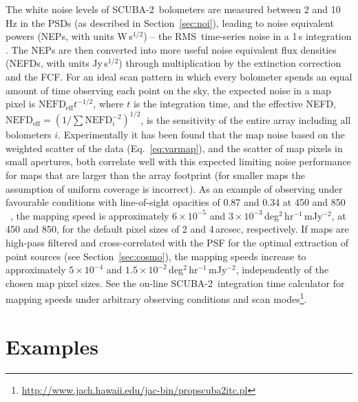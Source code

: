 \documentclass[useAMS,usenatbib,nofootinbib]{mn2e}
\newcommand{\scuba}{SCUBA-2}
\newcommand{\rms}{RMS}
\begin{document}
The white noise levels of \scuba\ bolometers are measured between 2
and 10\,Hz in the PSDs (as described in Section~\ref{sec:noi}),
leading to noise equivalent powers (NEPs, with units W\,s$^{1/2}$) --
the \rms\ time-series noise in a 1\,s integration \citep[see section
3.5.2 in][]{holland2012}. The NEPs are then converted into more useful
noise equivalent flux densities (NEFDs, with units Jy\,s$^{1/2}$)
through multiplication by the extinction correction and the FCF. For
an ideal scan pattern in which every bolometer spends an equal amount
of time observing each point on the sky, the expected noise in a map
pixel is $\mathrm{NEFD_{eff}} t^{-1/2}$, where $t$ is the integration
time, and the effective NEFD, $\mathrm{NEFD_{eff}} = (1/\sum
\mathrm{NEFD}_i^{-2})^{1/2}$, is the sensitivity of the entire array
including all bolometers $i$. Experimentally it has been found that
the map noise based on the weighted scatter of the data
(Eq.~\ref{eq:varmap}), and the scatter of map pixels in small
apertures, both correlate well with this expected limiting noise
performance for maps that are larger than the array footprint (for
smaller maps the assumption of uniform coverage is incorrect). As an
example of observing under favourable conditions with line-of-sight
opacities of 0.87 and 0.34 at 450 and 850\,\micron\ \citep[zenith sky
opacities at 225\,GHz of 0.04 and 0.065 at 450 and 850\,\micron,
respectively, at an average airmass of 1.2, from table 3
in][]{holland2012}, the mapping speed is approximately
$6\times10^{-5}$ and $3\times10^{-3}$\,deg$^2$\,hr$^{-1}$\,mJy$^{-2}$,
at 450 and 850\micron, for the default pixel sizes of 2 and 4\,arcsec,
respectively. If maps are high-pass filtered and cross-correlated with
the PSF for the optimal extraction of point sources (see
Section~\ref{sec:cosmo}), the mapping speeds increase to approximately
$5\times10^{-4}$ and
$1.5\times10^{-2}$\,deg$^2$\,hr$^{-1}$\,mJy$^{-2}$, independently of
the chosen map pixel sizes. See the on-line \scuba\ integration time
calculator for mapping speeds under arbitrary observing conditions
and scan
modes\footnote{\url{http://www.jach.hawaii.edu/jac-bin/propscuba2itc.pl}}.


\section{Examples}
\label{sec:examples}
\end{document}
